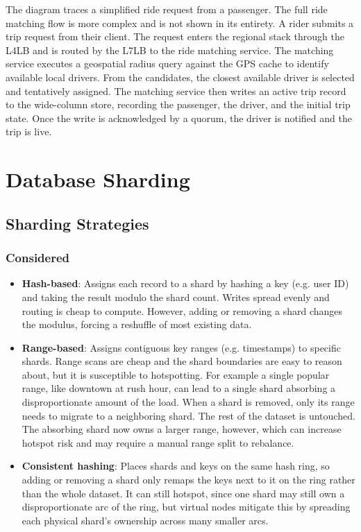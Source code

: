 \documentclass[12pt]{article}
\begin{document}
The diagram traces a simplified ride request from a passenger. The full ride matching flow is more complex and is not shown in its entirety. A rider submits a trip request from their client. The request enters the regional stack through the L4LB and is routed by the L7LB to the ride matching service. The matching service executes a geospatial radius query against the GPS cache to identify available local drivers. From the candidates, the closest available driver is selected and tentatively assigned. The matching service then writes an active trip record to the wide-column store, recording the passenger, the driver, and the initial trip state. Once the write is acknowledged by a quorum, the driver is notified and the trip is live.

\section{Database Sharding}
\label{sec:sharding}

\subsection{Sharding Strategies}

\subsubsection{Considered}
\begin{itemize}
    \item \textbf{Hash-based}: Assigns each record to a shard by hashing a key (e.g. user ID) and taking the result modulo the shard count. Writes spread evenly and routing is cheap to compute. However, adding or removing a shard changes the modulus, forcing a reshuffle of most existing data.
    \item \textbf{Range-based}: Assigns contiguous key ranges (e.g. timestamps) to specific shards. Range scans are cheap and the shard boundaries are easy to reason about, but it is susceptible to hotspotting. For example a single popular range, like downtown at rush hour, can lead to a single shard absorbing a disproportionate amount of the load. When a shard is removed, only its range needs to migrate to a neighboring shard. The rest of the dataset is untouched. The absorbing shard now owns a larger range, however, which can increase hotspot risk and may require a manual range split to rebalance.
    \item \textbf{Consistent hashing}\cite{consistenthashing}: Places shards and keys on the same hash ring, so adding or removing a shard only remaps the keys next to it on the ring rather than the whole dataset. It can still hotspot, since one shard may still own a disproportionate arc of the ring, but virtual nodes mitigate this by spreading each physical shard's ownership across many smaller arcs.
\end{itemize}
\end{document}
